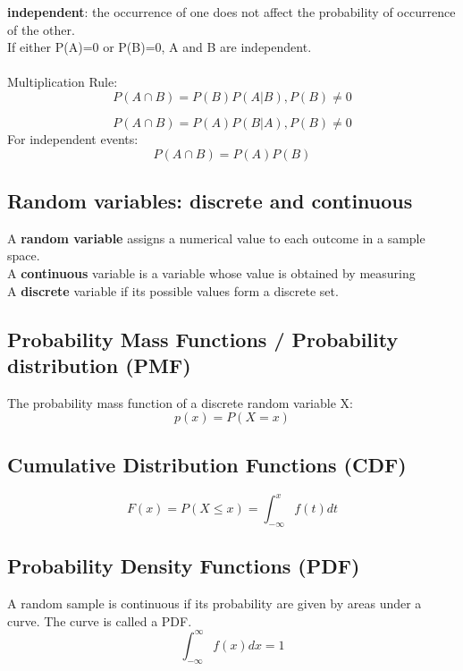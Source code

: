 \documentclass[../main.tex]{subfiles}
\begin{document}
\textbf{independent}: the occurrence of one does not affect the probability of occurrence of the other.\\
If either P(A)=0 or P(B)=0, A and B are independent.\\
\\
Multiplication Rule:
\begin{equation*}
    P(A\cap B)=P(B)P(A|B), P(B)\neq 0
\end{equation*}

\begin{equation*}
    P(A\cap B)=P(A)P(B|A), P(B)\neq 0
\end{equation*}
For independent events:
\begin{equation*}
    P(A\cap B)=P(A)P(B)
\end{equation*}

\subsection{Random variables: discrete and continuous}
A \textbf{random variable} assigns a numerical value to each outcome in a sample space.\\
A \textbf{continuous} variable is a variable whose value is obtained by measuring\\
A \textbf{discrete} variable if its possible values form a discrete set.

\subsection{Probability Mass Functions / Probability distribution (PMF)}
The probability mass function of a discrete random variable X:
\begin{equation*}
p(x) = P(X=x)
\end{equation*}

\subsection{Cumulative Distribution Functions (CDF)}
\begin{equation*}
F(x) = P(X\leq x)=\int_{-\infty}^{x}f(t)dt
\end{equation*}

\subsection{Probability Density Functions (PDF)}
A random sample is continuous if its probability are given by areas under a curve.
The curve is called a PDF.
\begin{equation*}
\int_{-\infty}^{\infty}f(x)dx=1
\end{equation*}
\end{document}
